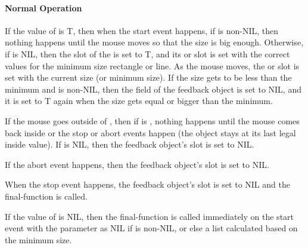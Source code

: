 \paragraph{Normal Operation}
If the value of  is T,
then when the start event happens,
if  is non-NIL, then nothing happens until the
mouse moves so that the size is big enough.  Otherwise,
if  is NIL, then the  slot of the
 is set to T, and its  or  slot is
set with the correct values for the minimum size rectangle or line.  As the
mouse moves, the  or  slot is set with the current
size (or minimum size).  If the size gets to be less than the minimum and
 is non-NIL, then the  field of the
feedback object is set to NIL, and it is set to T again when the size gets
equal or bigger than the minimum.

If the mouse goes outside of , then if  is
, nothing happens until the mouse comes back inside or the stop
or abort events happen (the object stays at its last legal inside value).
If  is NIL, then the feedback
object's  slot is set to NIL.

If the abort event happens, then the feedback
object's  slot is set to NIL.

When the stop event happens, the feedback
object's  slot is set to NIL and the final-function is called.

If the value of  is NIL, then the final-function is
called immediately on the start event with the 
parameter as NIL if  is non-NIL, or else a list
calculated based on the minimum size.


